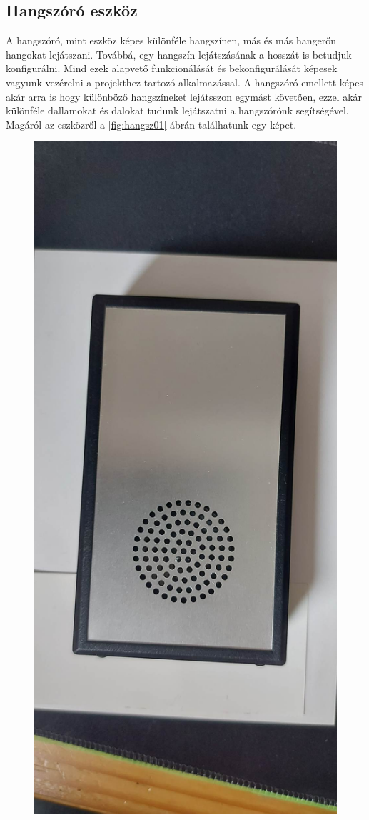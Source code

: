 \documentclass[tocnopagenum]{thesis-ekf}
\theoremstyle{definition}
\theoremstyle{remark}
\begin{document}
	\subsection{Hangszóró eszköz}
	A hangszóró, mint eszköz képes különféle hangszínen, más és más hangerőn hangokat lejátszani. Továbbá, egy hangszín lejátszásának a hosszát is betudjuk konfigurálni. Mind ezek alapvető funkcionálását és bekonfigurálását képesek vagyunk vezérelni a projekthez tartozó alkalmazással. A hangszóró emellett képes akár arra is hogy különböző hangszíneket lejátsszon egymást követően, ezzel akár különféle dallamokat és dalokat tudunk lejátszatni a hangszórónk segítségével.
	\\
	Magáról az eszközről a \ref{fig:hangsz01} ábrán találhatunk egy képet.
	\begin{figure}[H]	
		\centering
		\includegraphics[scale=0.10]{hangsz01}

\end{figure}
\end{document}
